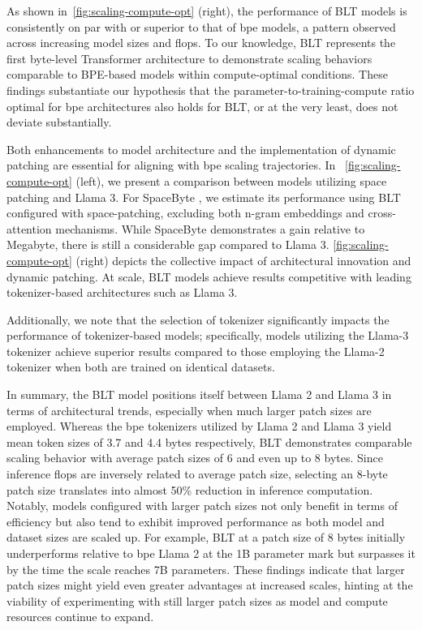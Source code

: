 As shown in~\autoref{fig:scaling-compute-opt} (right), the performance of {\textsc BLT} models is consistently on par with or superior to that of bpe models, a pattern observed across increasing model sizes and flops. To our knowledge, {\textsc BLT} represents the first byte-level Transformer architecture to demonstrate scaling behaviors comparable to BPE-based models within compute-optimal conditions. These findings substantiate our hypothesis that the parameter-to-training-compute ratio optimal for bpe architectures also holds for {\textsc BLT}, or at the very least, does not deviate substantially.

Both enhancements to model architecture and the implementation of dynamic patching are essential for aligning with bpe scaling trajectories. In ~\autoref{fig:scaling-compute-opt} (left), we present a comparison between models utilizing space patching and Llama 3. For SpaceByte \citep{slagle2024spacebyte}, we estimate its performance using {\textsc BLT} configured with space-patching, excluding both n-gram embeddings and cross-attention mechanisms. While SpaceByte demonstrates a gain relative to Megabyte, there is still a considerable gap compared to Llama 3. \autoref{fig:scaling-compute-opt} (right) depicts the collective impact of architectural innovation and dynamic patching. At scale, {\textsc BLT} models achieve results competitive with leading tokenizer-based architectures such as Llama 3.

Additionally, we note that the selection of tokenizer significantly impacts the performance of tokenizer-based models; specifically, models utilizing the Llama-3 tokenizer achieve superior results compared to those employing the Llama-2 tokenizer when both are trained on identical datasets.

In summary, the {\textsc BLT} model positions itself between Llama 2 and Llama 3 in terms of architectural trends, especially when much larger patch sizes are employed. Whereas the bpe tokenizers utilized by Llama 2 and Llama 3 yield mean token sizes of 3.7 and 4.4 bytes respectively, {\textsc BLT} demonstrates comparable scaling behavior with average patch sizes of 6 and even up to 8 bytes. Since inference flops are inversely related to average patch size, selecting an 8-byte patch size translates into almost 50\% reduction in inference computation. Notably, models configured with larger patch sizes not only benefit in terms of efficiency but also tend to exhibit improved performance as both model and dataset sizes are scaled up. For example, {\textsc BLT} at a patch size of 8 bytes initially underperforms relative to bpe Llama 2 at the 1B parameter mark but surpasses it by the time the scale reaches 7B parameters. These findings indicate that larger patch sizes might yield even greater advantages at increased scales, hinting at the viability of experimenting with still larger patch sizes as model and compute resources continue to expand.

